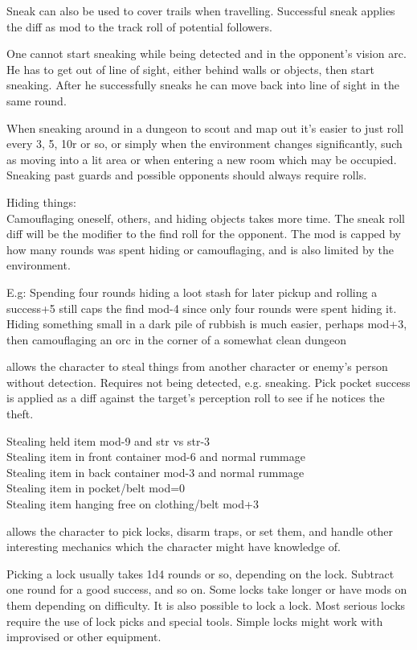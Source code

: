 Sneak can also be used to cover trails when travelling. Successful sneak applies the diff as mod to the track roll of potential followers.

One cannot start sneaking while being detected and in the opponent's vision arc. He has to get out of line of sight, either behind walls or objects, then start sneaking. After he successfully sneaks he can move back into line of sight in the same round.

When sneaking around in a dungeon to scout and map out it's easier to just roll every 3, 5, 10r or so, or simply when the environment changes significantly, such as moving into a lit area or when entering a new room which may be occupied. Sneaking past guards and possible opponents should always require rolls.

Hiding things:\\
Camouflaging oneself, others, and hiding objects takes more time. The sneak roll diff will be the modifier to the find roll for the opponent. The mod is capped by how many rounds was spent hiding or camouflaging, and is also limited by the environment.

E.g: Spending four rounds hiding a loot stash for later pickup and rolling a success+5 still caps the find mod-4 since only four rounds were spent hiding it.
Hiding something small in a dark pile of rubbish is much easier, perhaps mod+3, then camouflaging an orc in the corner of a somewhat clean dungeon


 allows the character to steal things from another character or enemy's person without detection. Requires not being detected, e.g. sneaking. Pick pocket success is applied as a diff against the target's perception roll to see if he notices the theft.

Stealing held item mod-9 and str vs str-3 \\
Stealing item in front container mod-6 and normal rummage \\
Stealing item in back container mod-3 and normal rummage \\
Stealing item in pocket/belt mod=0 \\
Stealing item hanging free on clothing/belt mod+3


 allows the character to pick locks, disarm traps, or set them, and handle other interesting mechanics which the character might have knowledge of.

Picking a lock usually takes 1d4 rounds or so, depending on the lock. Subtract one round for a good success, and so on. Some locks take longer or have mods on them depending on difficulty. It is also possible to lock a lock.
Most serious locks require the use of lock picks and special tools. Simple locks might work with improvised or other equipment.

